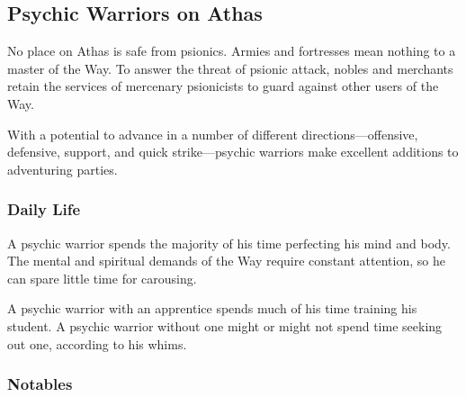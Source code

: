 \subsection{Psychic Warriors on Athas}

No place on Athas is safe from psionics. Armies and fortresses mean nothing to a master of the Way. To answer the threat of psionic attack, nobles and merchants retain the services of mercenary psionicists to guard against other users of the Way.

With a potential to advance in a number of different directions---offensive, defensive, support, and quick strike---psychic warriors make excellent additions to adventuring parties.

\subsubsection{Daily Life}

A psychic warrior spends the majority of his time perfecting his mind and body. The mental and spiritual demands of the Way require constant attention, so he can spare little time for carousing.

A psychic warrior with an apprentice spends much of his time training his student. A psychic warrior without one might or might not spend time seeking out one, according to his whims.

\subsubsection{Notables}

